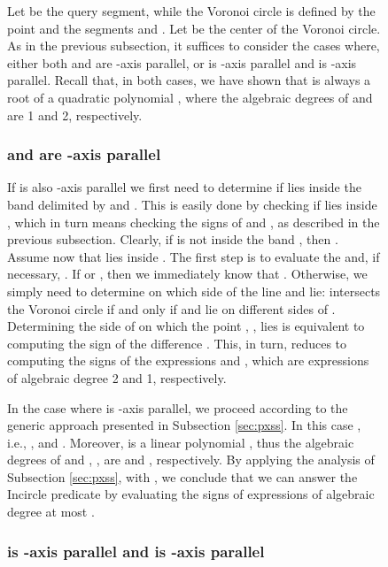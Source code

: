 \documentclass[letterpaper,11pt]{article}
\newcommand{\incircle}{\textsf{Incircle}\xspace}
\newcommand{\vor}{Voronoi\xspace}
\begin{document}
{\begin{figure}[!b]
Let  be the query segment, while the \vor
circle is defined by the point  and the segments  and . Let
 be the center of the \vor circle. As in the previous
subsection, it suffices to consider the cases where, either both 
and  are -axis parallel, or  is -axis parallel and 
is -axis parallel. Recall that, in both cases, we have shown that
 is always a root of a quadratic polynomial ,
where the algebraic degrees of  and  are 1 and 2, respectively.


\subsubsection{ and  are -axis parallel}\label{sec:psss-parallel}

If  is also -axis parallel we first need to determine if 
lies inside the band  delimited by  and
. This is easily done by checking if  lies inside ,
which in turn means checking the signs of  and , as
described in the previous subsection. Clearly, if  is not inside
the band , then .
Assume now that  lies inside . The first step is to evaluate
the  and, if necessary,
. If  or
, then we immediately know that
. Otherwise, we simply need to determine on
which side of the line   and  lie:  intersects the
\vor circle  if and only if  and  lie on different
sides of . Determining the side of  on which the point
, , lies is equivalent to computing the sign of the
difference . This, in turn, reduces to computing the
signs of the expressions  and , which are
expressions of algebraic degree 2 and 1, respectively.

In the case where  is -axis parallel, we proceed according to
the generic approach presented in Subsection \ref{sec:pxss}. In this
case , i.e., ,
 and . Moreover,  is a linear
polynomial , thus the algebraic degrees of 
and , , are  and ,
respectively. By applying the analysis of Subsection \ref{sec:pxss},
with , 
we conclude that we can answer the \incircle predicate by evaluating
the signs of expressions of algebraic degree at most
.


\subsubsection{ is -axis parallel and  is -axis
  parallel}\label{sec:psss-vertical}


\end{figure}}
\end{document}
